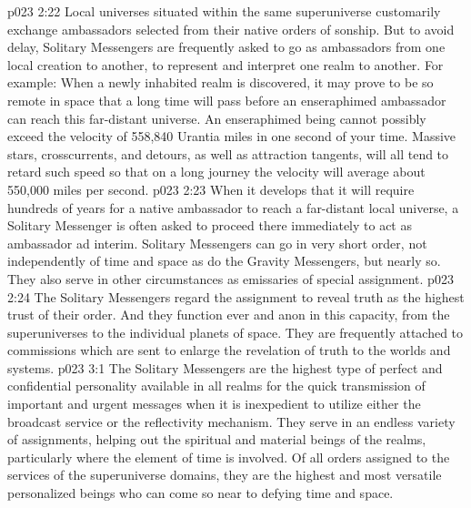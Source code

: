 \pc \vs p023 2:22 \bibnobreakspace {} Local universes situated within the same superuniverse customarily exchange ambassadors selected from their native orders of sonship. But to avoid delay, Solitary Messengers are frequently asked to go as ambassadors from one local creation to another, to represent and interpret one realm to another. For example: When a newly inhabited realm is discovered, it may prove to be so remote in space that a long time will pass before an enseraphimed ambassador can reach this far\hyp{}distant universe. An enseraphimed being cannot possibly exceed the velocity of 558,840 Urantia miles in one second of your time. Massive stars, crosscurrents, and detours, as well as attraction tangents, will all tend to retard such speed so that on a long journey the velocity will average about 550,000 miles per second.
\vs p023 2:23 When it develops that it will require hundreds of years for a native ambassador to reach a far\hyp{}distant local universe, a Solitary Messenger is often asked to proceed there immediately to act as ambassador ad interim. Solitary Messengers can go in very short order, not independently of time and space as do the Gravity Messengers, but nearly so. They also serve in other circumstances as emissaries of special assignment.
\pc \vs p023 2:24 \bibnobreakspace {} The Solitary Messengers regard the assignment to reveal truth as the highest trust of their order. And they function ever and anon in this capacity, from the superuniverses to the individual planets of space. They are frequently attached to commissions which are sent to enlarge the revelation of truth to the worlds and systems.
\vs p023 3:1 The Solitary Messengers are the highest type of perfect and confidential personality available in all realms for the quick transmission of important and urgent messages when it is inexpedient to utilize either the broadcast service or the reflectivity mechanism. They serve in an endless variety of assignments, helping out the spiritual and material beings of the realms, particularly where the element of time is involved. Of all orders assigned to the services of the superuniverse domains, they are the highest and most versatile personalized beings who can come so near to defying time and space.
